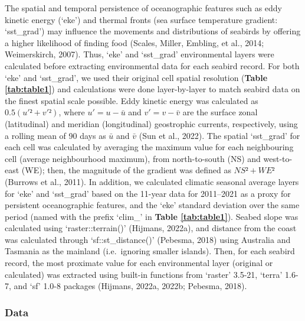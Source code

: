 \documentclass{article}
\begin{document}
\begin{linenumbers}
The spatial and temporal persistence of oceanographic features such as eddy kinetic energy (`eke') and thermal fronts (sea surface temperature gradient: `sst\_grad') may influence the movements and distributions of seabirds by offering a higher likelihood of finding food (Scales, Miller, Embling, et al., 2014; Weimerskirch, 2007). Thus, `eke' and `sst\_grad' environmental layers were calculated before extracting environmental data for each seabird record. For both `eke' and `sst\_grad', we used their original cell spatial resolution (\textbf{Table \ref{tab:table1}}) and calculations were done layer-by-layer to match seabird data on the finest spatial scale possible. Eddy kinetic energy was calculated as \(0.5 (u'² + v'²)\), where \(u' = u - \bar{u}\) and \(v' = v - \bar{v}\) are the surface zonal (latitudinal) and meridian (longitudinal) geostrophic currents, respectively, using a rolling mean of 90 days as \(\bar{u}\) and \(\bar{v}\) (Sun et al., 2022). The spatial `sst\_grad' for each cell was calculated by averaging the maximum value for each neighbouring cell (average neighbourhood maximum), from north-to-south (NS) and west-to-east (WE); then, the magnitude of the gradient was defined as \(NS² + WE²\) (Burrows et al., 2011). In addition, we calculated climatic seasonal average layers for `eke' and `sst\_grad' based on the 11-year data for 2011--2021 as a proxy for persistent oceanographic features, and the `eke' standard deviation over the same period (named with the prefix `clim\_' in \textbf{Table \ref{tab:table1}}). Seabed slope was calculated using `raster::terrain()' (Hijmans, 2022a), and distance from the coast was calculated through `sf::st\_distance()' (Pebesma, 2018) using Australia and Tasmania as the mainland (i.e.~ignoring smaller islands). Then, for each seabird record, the most proximate value for each environmental layer (original or calculated) was extracted using built-in functions from `raster' 3.5-21, `terra' 1.6-7, and `sf' 1.0-8 packages (Hijmans, 2022a, 2022b; Pebesma, 2018).

\hypertarget{modellingdatasets}{%
\subsubsection{Data}\label{modellingdatasets}}

\label{sec:modellingdatasets}


\end{linenumbers}
\end{document}
